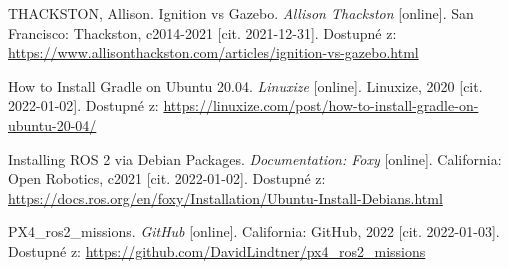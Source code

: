 \begin{thebibliography}{99}
THACKSTON, Allison. Ignition vs Gazebo. \textit{Allison Thackston} [online]. San Francisco: Thackston, c2014-2021 [cit. 2021-12-31]. Dostupné z: \href{https://www.allisonthackston.com/articles/ignition-vs-gazebo.html}{https://www.allisonthackston.com/articles/ignition-vs-gazebo.html}


How to Install Gradle on Ubuntu 20.04. \textit{Linuxize} [online]. Linuxize, 2020 [cit. 2022-01-02]. Dostupné z: \href{https://linuxize.com/post/how-to-install-gradle-on-ubuntu-20-04/}{https://linuxize.com/post/how-to-install-gradle-on-ubuntu-20-04/}



Installing ROS 2 via Debian Packages. \textit{Documentation: Foxy} [online]. California: Open Robotics, c2021 [cit. 2022-01-02]. Dostupné z: \href{https://docs.ros.org/en/foxy/Installation/Ubuntu-Install-Debians.html}{https://docs.ros.org/en/foxy/Installation/Ubuntu-Install-Debians.html}


PX4\_ros2\_missions. \textit{GitHub} [online]. California: GitHub, 2022 [cit. 2022-01-03]. Dostupné z: \href{https://github.com/DavidLindtner/px4\_ros2\_missions}{https://github.com/DavidLindtner/px4\_ros2\_missions}






\end{thebibliography}
